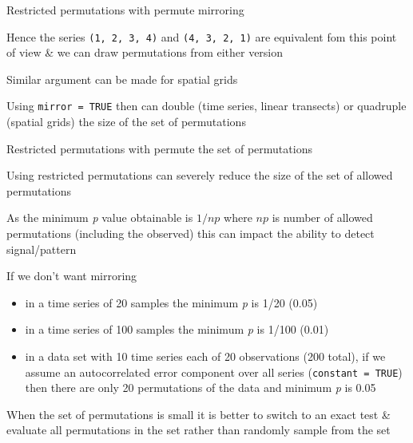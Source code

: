 \documentclass[10pt,ignorenonframetext,compress, aspectratio=169]{beamer}
\providecommand{\tightlist}{%
  \setlength{\itemsep}{0pt}\setlength{\parskip}{0pt}}
\begin{document}
\begin{frame}[fragile]{Restricted permutations with permute \textbar{}
mirroring}

Hence the series \texttt{(1,\ 2,\ 3,\ 4)} and \texttt{(4,\ 3,\ 2,\ 1)}
are equivalent fom this point of view \& we can draw permutations from
either version

Similar argument can be made for spatial grids

Using \texttt{mirror\ =\ TRUE} then can double (time series, linear
transects) or quadruple (spatial grids) the size of the set of
permutations

\end{frame}

\begin{frame}[fragile]{Restricted permutations with permute \textbar{}
the set of permutations}

Using restricted permutations can severely reduce the size of the set of
allowed permutations

As the minimum \emph{p} value obtainable is \(1 / np\) where \(np\) is
number of allowed permutations (including the observed) this can impact
the ability to detect signal/pattern

If we don't want mirroring

\begin{itemize}
\tightlist
\item
  in a time series of 20 samples the minimum \emph{p} is 1/20 (0.05)
\item
  in a time series of 100 samples the minimum \emph{p} is 1/100 (0.01)
\item
  in a data set with 10 time series each of 20 observations (200 total),
  if we assume an autocorrelated error component over all series
  (\texttt{constant\ =\ TRUE}) then there are only 20 permutations of
  the data and minimum \emph{p} is 0.05
\end{itemize}

When the set of permutations is small it is better to switch to an exact
test \& evaluate all permutations in the set rather than randomly sample
from the set

\end{frame}
\end{document}

